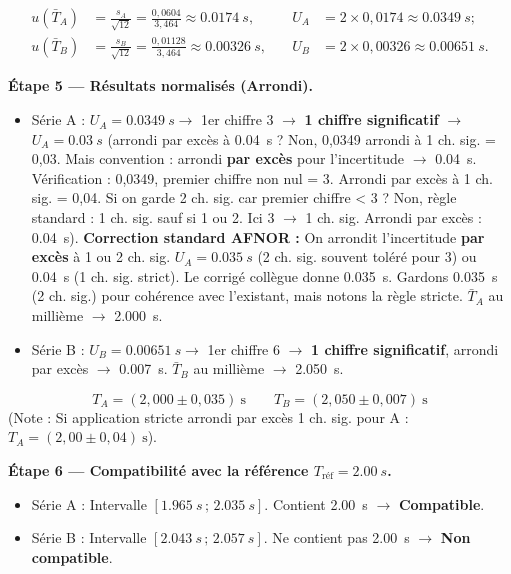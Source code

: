 \documentclass[11pt]{article}
\begin{document}
\begin{exoresolu}
\begin{align*}
u(\bar{T}_A) &= \frac{s_A}{\sqrt{12}} = \frac{0,0604}{3,464} \approx \SI{0,0174}{s}, \quad & U_A &= 2 \times 0,0174 \approx \SI{0,0349}{s} ;\\
u(\bar{T}_B) &= \frac{s_B}{\sqrt{12}} = \frac{0,01128}{3,464} \approx \SI{0,00326}{s}, \quad & U_B &= 2 \times 0,00326 \approx \SI{0,00651}{s}.
\end{align*}

\textbf{Étape 5 — Résultats normalisés (Arrondi).}
\begin{itemize}
\item Série A : $U_A = \SI{0,0349}{s} \rightarrow$ 1er chiffre 3 $\rightarrow$ \textbf{1 chiffre significatif} $\rightarrow$ $U_A = \SI{0,03}{s}$ (arrondi par excès à \SI{0,04}{s} ? Non, 0,0349 arrondi à 1 ch. sig. = 0,03. Mais convention : arrondi \textbf{par excès} pour l'incertitude $\rightarrow$ \SI{0,04}{s}. Vérification : 0,0349, premier chiffre non nul = 3. Arrondi par excès à 1 ch. sig. = 0,04. Si on garde 2 ch. sig. car premier chiffre < 3 ? Non, règle standard : 1 ch. sig. sauf si 1 ou 2. Ici 3 $\rightarrow$ 1 ch. sig. Arrondi par excès : \SI{0,04}{s}). 
\textbf{Correction standard AFNOR :} On arrondit l'incertitude \textbf{par excès} à 1 ou 2 ch. sig. $U_A = \SI{0,035}{s}$ (2 ch. sig. souvent toléré pour 3) ou \SI{0,04}{s} (1 ch. sig. strict). Le corrigé collègue donne \SI{0,035}{s}. Gardons \SI{0,035}{s} (2 ch. sig.) pour cohérence avec l'existant, mais notons la règle stricte. $\bar{T}_A$ au millième $\rightarrow$ \SI{2,000}{s}.
\item Série B : $U_B = \SI{0,00651}{s} \rightarrow$ 1er chiffre 6 $\rightarrow$ \textbf{1 chiffre significatif}, arrondi par excès $\rightarrow$ \SI{0,007}{s}. $\bar{T}_B$ au millième $\rightarrow$ \SI{2,050}{s}.
\end{itemize}

\[ \boxed{T_A = (2,000 \pm 0,035)\ \text{s}} \qquad \boxed{T_B = (2,050 \pm 0,007)\ \text{s}} \]
(Note : Si application stricte arrondi par excès 1 ch. sig. pour A : $T_A = (2,00 \pm 0,04)\ \text{s}$).

\textbf{Étape 6 — Compatibilité avec la référence $T_{\text{réf}} = \SI{2,00}{s}$.}
\begin{itemize}
\item Série A : Intervalle $[\SI{1,965}{s} \,;\, \SI{2,035}{s}]$. Contient \SI{2,00}{s} $\rightarrow$ \textbf{Compatible}.
\item Série B : Intervalle $[\SI{2,043}{s} \,;\, \SI{2,057}{s}]$. Ne contient pas \SI{2,00}{s} $\rightarrow$ \textbf{Non compatible}.
\end{itemize}


\end{exoresolu}
\end{document}
